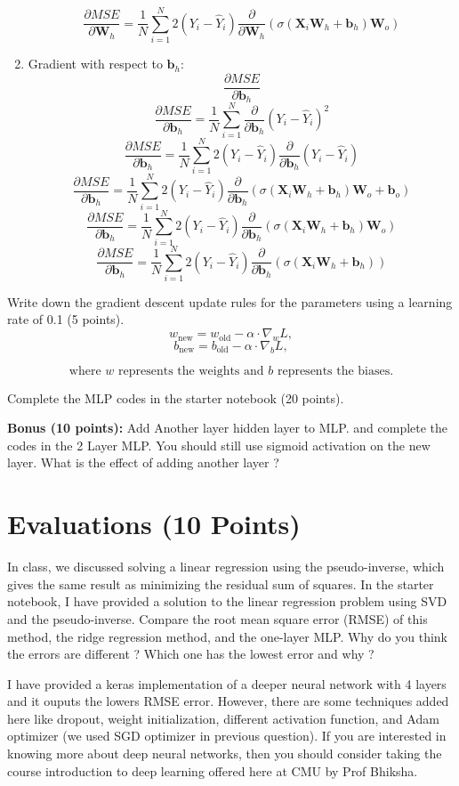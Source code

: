 \documentclass{article}
\begin{document}
\begin{enumerate}
\[    \]
    \[
    \frac{\partial MSE}{\partial \mathbf{W}_h} = \frac{1}{N} \sum_{i=1}^{N} 2(Y_i - \hat{Y}_i) \frac{\partial}{\partial \mathbf{W}_h} (\sigma(\mathbf{X}_i \mathbf{W}_h + \mathbf{b}_h) \mathbf{W}_o)
    \]
    \item Gradient with respect to $\mathbf{b}_h$: $$\frac{\partial MSE}{\partial \mathbf{b}_h}$$
    \[
    \frac{\partial MSE}{\partial \mathbf{b}_h} = \frac{1}{N} \sum_{i=1}^{N} \frac{\partial}{\partial \mathbf{b}_h} (Y_i - \hat{Y}_i)^2
    \]
    \[
    \frac{\partial MSE}{\partial \mathbf{b}_h} = \frac{1}{N} \sum_{i=1}^{N} 2(Y_i - \hat{Y}_i) \frac{\partial}{\partial \mathbf{b}_h} (Y_i - \hat{Y}_i)
    \]
    \[
    \frac{\partial MSE}{\partial \mathbf{b}_h} = \frac{1}{N} \sum_{i=1}^{N} 2(Y_i - \hat{Y}_i) \frac{\partial}{\partial \mathbf{b}_h} (\sigma(\mathbf{X}_i \mathbf{W}_h + \mathbf{b}_h) \mathbf{W}_o + \mathbf{b}_o)
    \]
    \[
    \frac{\partial MSE}{\partial \mathbf{b}_h} = \frac{1}{N} \sum_{i=1}^{N} 2(Y_i - \hat{Y}_i) \frac{\partial}{\partial \mathbf{b}_h} (\sigma(\mathbf{X}_i \mathbf{W}_h + \mathbf{b}_h) \mathbf{W}_o)
    \]
    \[
    \frac{\partial MSE}{\partial \mathbf{b}_h} = \frac{1}{N} \sum_{i=1}^{N} 2(Y_i - \hat{Y}_i) \frac{\partial}{\partial \mathbf{b}_h} (\sigma(\mathbf{X}_i \mathbf{W}_h + \mathbf{b}_h))
    \]
\end{enumerate}

Write down the gradient descent update rules for the parameters using a learning rate of 0.1 (5 points).
\[
w_{\text{new}} = w_{\text{old}} - \alpha \cdot \nabla_w L,
\]
\[
b_{\text{new}} = b_{\text{old}} - \alpha \cdot \nabla_b L,
\]

\[
\text{where } w \text{ represents the weights and } b \text{ represents the biases.}
\]

Complete the MLP codes in the starter notebook (20 points).

\textbf{Bonus (10 points):} Add Another layer hidden layer to MLP. and complete the codes in the 2 Layer MLP.
You should still use sigmoid activation on the new layer. What is the effect of adding another layer ?

\section{Evaluations (10 Points)}
In class, we discussed solving a linear regression using the pseudo-inverse, which gives the same result as minimizing the residual sum of squares. In the starter notebook, I have provided a solution to the linear regression problem using SVD and the pseudo-inverse. Compare the root mean square error (RMSE) of this method, the ridge regression method, and the one-layer MLP. Why do you think the errors are different ?
Which one has the lowest error and why ?

I have provided a keras implementation of a deeper neural network with 4 layers and it ouputs the lowers
RMSE error. However, there are some techniques added here like dropout, weight initialization, different
activation function, and Adam optimizer (we used SGD optimizer in previous question). If you are interested
in knowing more about deep neural networks, then you should consider taking the course introduction to
deep learning offered here at CMU by Prof Bhiksha.
\end{document}
